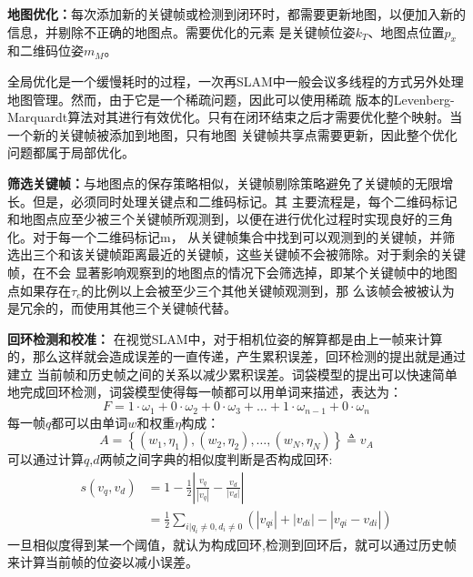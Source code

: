 \textbf{地图优化：}每次添加新的关键帧或检测到闭环时，都需要更新地图，以便加入新的信息，并剔除不正确的地图点。需要优化的元素
是关键帧位姿$k_T$、地图点位置$p_x$和二维码位姿$m_M$。

全局优化是一个缓慢耗时的过程，一次再SLAM中一般会议多线程的方式另外处理地图管理。然而，由于它是一个稀疏问题，因此可以使用稀疏
版本的Levenberg-Marquardt算法对其进行有效优化。只有在闭环结束之后才需要优化整个映射。当一个新的关键帧被添加到地图，只有地图
关键帧共享点需要更新，因此整个优化问题都属于局部优化。

\textbf{筛选关键帧：}与地图点的保存策略相似，关键帧剔除策略避免了关键帧的无限增长。但是，必须同时处理关键点和二维码标记。其
主要流程是，每个二维码标记和地图点应至少被三个关键帧所观测到，以便在进行优化过程时实现良好的三角化。对于每一个二维码标记m，
从关键帧集合中找到可以观测到的关键帧，并筛选出三个和该关键帧距离最近的关键帧，这些关键帧不会被筛除。对于剩余的关键帧，在不会
显著影响观察到的地图点的情况下会筛选掉，即某个关键帧中的地图点如果存在$\tau_c$的比例以上会被至少三个其他关键帧观测到，那
么该帧会被被认为是冗余的，而使用其他三个关键帧代替。

\textbf{回环检测和校准：}
在视觉SLAM中，对于相机位姿的解算都是由上一帧来计算的，那么这样就会造成误差的一直传递，产生累积误差，回环检测的提出就是通过建立
当前帧和历史帧之间的关系以减少累积误差。词袋模型的提出可以快速简单地完成回环检测，词袋模型使得每一帧都可以用单词来描述，表达为：
\begin{equation}
  F=1 \cdot \omega_{1}+0 \cdot \omega_{2}+0 \cdot \omega_{3}+\ldots+1 \cdot \omega_{n-1}+0 \cdot \omega_{n}
\end{equation}
每一帧$q$都可以由单词$w$和权重$\eta$构成：
\begin{equation}
  A=\left\{\left(w_{1}, \eta_{1}\right),\left(w_{2}, \eta_{2}\right), \ldots,\left(w_{N}, \eta_{N}\right)\right\} \triangleq v_{A}
\end{equation}
可以通过计算$q$,$d$两帧之间字典的相似度判断是否构成回环:
\begin{equation}
  \begin{aligned} s\left(v_{q}, v_{d}\right) &=1-\frac{1}{2}\left|\frac{v_{q}}{\left|v_{q}\right|}-\frac{v_{d}}{\left|v_{d}\right|}\right| \\ &=\frac{1}{2} \sum_{i | q_{i} \neq 0, d_{i} \neq 0}\left(\left|v_{q i}\right|+\left|v_{d i}\right|-\left|v_{q i}-v_{d i}\right|\right) \end{aligned}
\end{equation}
一旦相似度得到某一个阈值，就认为构成回环,检测到回环后，就可以通过历史帧来计算当前帧的位姿以减小误差。

